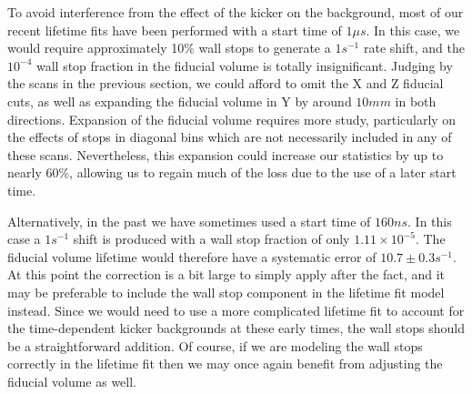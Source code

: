 To avoid interference from the effect of the kicker on the background, most of our recent lifetime fits have been performed with a start time of $1 \mu s$.
In this case, we would require approximately 10\% wall stops to generate a $1 s^{-1}$ rate shift, and the $10^{-4}$ wall stop fraction in the fiducial volume is totally insignificant.  
Judging by the scans in the previous section, we could afford to omit the X and Z fiducial cuts, as well as expanding the fiducial volume in Y by around $10 mm$ in both directions.
Expansion of the fiducial volume requires more study, particularly on the effects of stops in diagonal bins which are not necessarily included in any of these scans. 
Nevertheless, this expansion could increase our statistics by up to nearly 60\%, allowing us to regain much of the loss due to the use of a later start time.

Alternatively, in the past we have sometimes used a start time of $160 ns$.  
In this case a $1 s^{-1}$ shift is produced with a wall stop fraction of only $1.11 \times 10^{-5}$.
The fiducial volume lifetime would therefore have a systematic error of $10.7 \pm 0.3 s^{-1}$.
At this point the correction is a bit large to simply apply after the fact, and it may be preferable to include the wall stop component in the lifetime fit model instead.  
Since we would need to use a more complicated lifetime fit to account for the time-dependent kicker backgrounds at these early times, the wall stops should be a straightforward addition.
Of course, if we are modeling the wall stops correctly in the lifetime fit then we may once again benefit from adjusting the fiducial volume as well.

